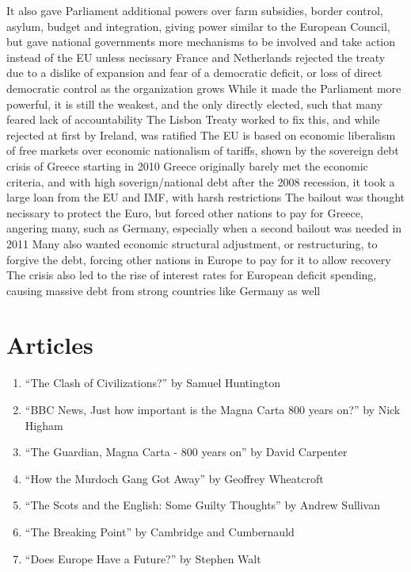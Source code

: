 \documentclass[11 pt, twoside]{article}
\newenvironment{outline*}
{
	\begin{outline}[enumerate]
	}
	{\end{outline}
}
\begin{document}
\begin{outline*}
\2 It also gave Parliament additional powers over farm subsidies, border control, asylum, budget and integration, giving power similar to the European Council, but gave national governments more mechanisms to be involved and take action instead of the EU unless necissary
\2 France and Netherlands rejected the treaty due to a dislike of expansion and fear of a democratic deficit, or loss of direct democratic control as the organization grows
\2 While it made the Parliament more powerful, it is still the weakest, and the only directly elected, such that many feared lack of accountability
\2 The Lisbon Treaty worked to fix this, and while rejected at first by Ireland, was ratified
\1 The EU is based on economic liberalism of free markets over economic nationalism of tariffs, shown by the sovereign debt crisis of Greece starting in 2010
\2 Greece originally barely met the economic criteria, and with high soverign/national debt after the 2008 recession, it took a large loan from the EU and IMF, with harsh restrictions
\2 The bailout was thought necissary to protect the Euro, but forced other nations to pay for Greece, angering many, such as Germany, especially when a second bailout was needed in 2011
\2 Many also wanted economic structural adjustment, or restructuring, to forgive the debt, forcing other nations in Europe to pay for it to allow recovery
\2 The crisis also led to the rise of interest rates for European deficit spending, causing massive debt from strong countries like Germany as well
\end{outline*}
\section{Articles}
\begin{enumerate}
\item \hypertarget{1}{``The Clash of Civilizations?'' by Samuel Huntington}
\item \hypertarget{2}{``BBC News, Just how important is the Magna Carta 800 years on?'' by Nick Higham}
\item \hypertarget{3}{``The Guardian, Magna Carta - 800 years on'' by David Carpenter}
\item \hypertarget{4}{``How the Murdoch Gang Got Away'' by Geoffrey Wheatcroft}
\item \hypertarget{5}{``The Scots and the English: Some Guilty Thoughts'' by Andrew Sullivan}
\item \hypertarget{6}{``The Breaking Point'' by Cambridge and Cumbernauld}
\item \hypertarget{7}{``Does Europe Have a Future?'' by Stephen Walt}
\end{enumerate}
\end{document}
